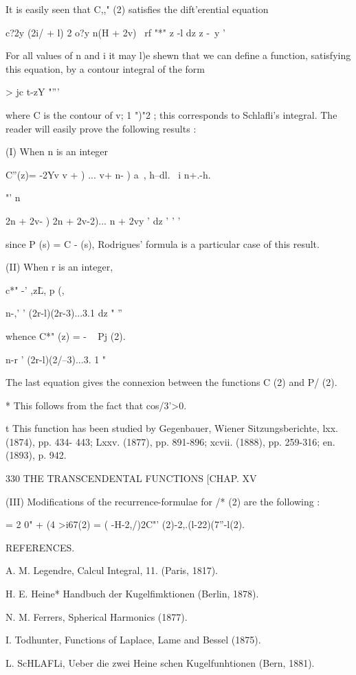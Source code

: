 {{{It is easily seen that C,," (2) satisfies the dift'erential equation

c?2y (2i/ + l) 2 o?y n(H + 2v) \ rf "*" z -l dz z -\ y '

For all values of n and i it may l)e shewn that we can define a
function, satisfying this equation, by a contour integral of the form

  > jc t-zY "'''

where C is the contour of v; 1 ")"2 ; this corresponds to Schlafli's
integral. The reader will easily prove the following results :

(I) When n is an integer

C''(z)= -2Yv v + ) ... v+ n- ) a\ , h--dl. \ i n+.-h.

"' n\ \ {2n + 2v- ) 2n + 2v-2)... n + 2vy ' dz ' ' '

since P (s) = C - (s), Rodrigues' formula is a particular case of this
result.

(II) When r is an integer,

c*" -' ,z\= L, p (,\

n-,' ' (2r-l)(2r-3)...3.1 dz " ''

whence C*" (z) = - ~ Pj (2).

n-r ' (2r-l)(2/--3)...3. 1 "

The last equation gives the connexion between the functions C (2) and
P/ (2).

* This follows from the fact that cos/3'>0.

t This function has been studied by Gegenbauer, Wiener
Sitzungsberichte, lxx. (1874), pp. 434- 443; Lxxv. (1877), pp.
891-896; xcvii. (1888), pp. 259-316; en. (1893), p. 942.



330 THE TRANSCENDENTAL FUNCTIONS [CHAP. XV

(III) Modifications of the recurrence-formulae for /* (2) are the
following :

   = 2 0" + (4 >i67(2) = ( -H-2,/)2C"' (2)-2,.(l-22)(7''-l(2).



REFERENCES.

A. M. Legendre, Calcul Integral, 11. (Paris, 1817).

H. E. Heine* Handbuch der Kugelfimktionen (Berlin, 1878).

N. M. Ferrers, Spherical Harmonics (1877).

I. Todhunter, Functions of Laplace, Lame and Bessel (1875).

L. ScHLAFLi, Ueber die zwei Heine schen Kugelfunhtionen (Bern, 1881).

}}}}
